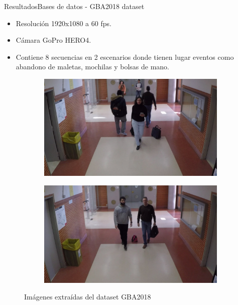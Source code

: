 
\begin{frame}{Resultados}{Bases de datos - GBA2018 dataset}

\begin{itemize}
    \justifying
    \item Resolución 1920x1080 a 60 fps.
    \item Cámara GoPro HERO4.
    \item Contiene 8 secuencias en 2 escenarios donde tienen lugar eventos como abandono de maletas, mochilas y bolsas de mano.
\end{itemize}

\vspace{0.1cm}

\begin{figure}[ht]
  \centering
  \begin{subfigure}[b]{0.4\textwidth}
    \includegraphics[width=\textwidth]{Images/resultados/datasets/GBA_3.jpg}
    \caption{}
    \label{fig:GBA_3}
  \end{subfigure}
  \qquad
  \begin{subfigure}[b]{0.4\textwidth}
    \includegraphics[width=\textwidth]{Images/resultados/datasets/GBA_4.jpg}
    \caption{}
    \label{fig:GBA_4}
  \end{subfigure}
  \caption{Imágenes extraídas del dataset GBA2018}
  \label{fig:GBA2018}
\end{figure}
    
\end{frame}

